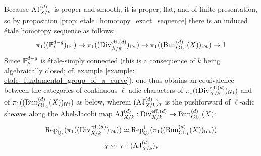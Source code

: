         \begin{corollary} \label{coro: galois_representations_induced_by_the_abel_jacobi_map}
            Because $\AJ_{X/k}^{(d)}$ is proper and smooth, it is proper, flat, and of finite presentation, so by proposition \ref{prop: etale_homotopy_exact_sequence} there is an induced \'etale homotopy sequence as follows:
                $$\pi_1((\P^{d - g}_k)_{\fet}) \to \pi_1((\Div_{X/k}^{\eff, (d)})_{\fet}) \to \pi_1((\Bun_{\GL_1}^{(d)}(X))_{\fet}) \to 1$$
            Since $\P^{d - g}_k$ is \'etale-simply connected (this is a consequence of $k$ being algebraically closed; cf. example \ref{example: etale_fundamental_group_of_a_curve}), one thus obtains an equivalence between the categories of continuous $\ell$-adic characters of $\pi_1((\Div_{X/k}^{\eff, (d)})_{\fet})$ and of $\pi_1((\Bun_{\GL_1}^{(d)}(X))_{\fet})$ as below, wherein $(\AJ_{X/k}^{(d)})_*$ is the pushforward of $\ell$-adic sheaves along the Abel-Jacobi map $\AJ_{X/k}^{(d)}: \Div_{X/k}^{\eff, (d)} \to \Bun_{\GL_1}^{(d)}(X)$:
                $$\Rep^1_{\bar{\Q}_{\ell}}(\pi_1((\Div_{X/k}^{\eff, (d)})_{\fet})) \cong \Rep^1_{\bar{\Q}_{\ell}}(\pi_1((\Bun_{\GL_1}^{(d)}(X))_{\fet}))$$
                $$\chi \mapsto \chi \circ (\AJ_{X/k}^{(d)})_*$$
        \end{corollary}
    
